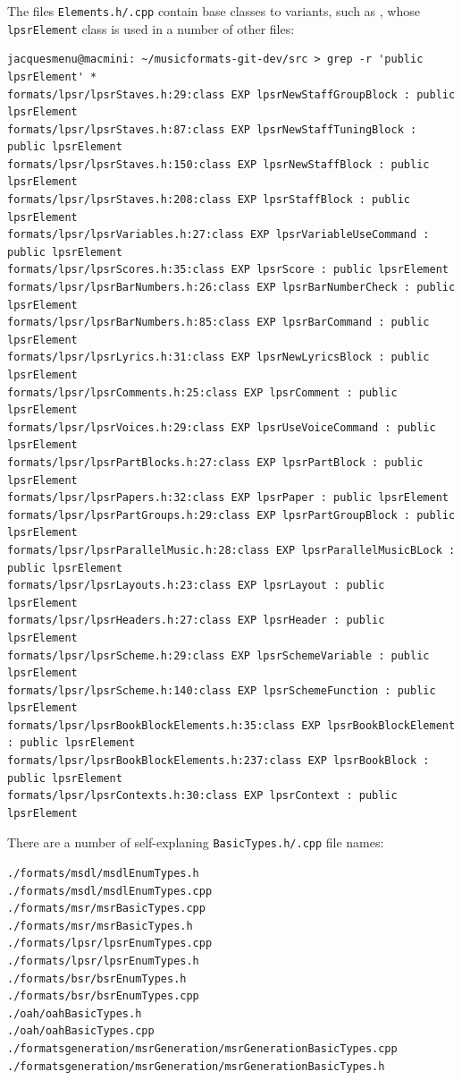 The files {\tt *Elements.h/.cpp} contain base classes to variants, such as , whose {\tt lpsrElement} class   is used in a number of other files:
\begin{lstlisting}[language=Terminal]
jacquesmenu@macmini: ~/musicformats-git-dev/src > grep -r 'public lpsrElement' *
formats/lpsr/lpsrStaves.h:29:class EXP lpsrNewStaffGroupBlock : public lpsrElement
formats/lpsr/lpsrStaves.h:87:class EXP lpsrNewStaffTuningBlock : public lpsrElement
formats/lpsr/lpsrStaves.h:150:class EXP lpsrNewStaffBlock : public lpsrElement
formats/lpsr/lpsrStaves.h:208:class EXP lpsrStaffBlock : public lpsrElement
formats/lpsr/lpsrVariables.h:27:class EXP lpsrVariableUseCommand : public lpsrElement
formats/lpsr/lpsrScores.h:35:class EXP lpsrScore : public lpsrElement
formats/lpsr/lpsrBarNumbers.h:26:class EXP lpsrBarNumberCheck : public lpsrElement
formats/lpsr/lpsrBarNumbers.h:85:class EXP lpsrBarCommand : public lpsrElement
formats/lpsr/lpsrLyrics.h:31:class EXP lpsrNewLyricsBlock : public lpsrElement
formats/lpsr/lpsrComments.h:25:class EXP lpsrComment : public lpsrElement
formats/lpsr/lpsrVoices.h:29:class EXP lpsrUseVoiceCommand : public lpsrElement
formats/lpsr/lpsrPartBlocks.h:27:class EXP lpsrPartBlock : public lpsrElement
formats/lpsr/lpsrPapers.h:32:class EXP lpsrPaper : public lpsrElement
formats/lpsr/lpsrPartGroups.h:29:class EXP lpsrPartGroupBlock : public lpsrElement
formats/lpsr/lpsrParallelMusic.h:28:class EXP lpsrParallelMusicBLock : public lpsrElement
formats/lpsr/lpsrLayouts.h:23:class EXP lpsrLayout : public lpsrElement
formats/lpsr/lpsrHeaders.h:27:class EXP lpsrHeader : public lpsrElement
formats/lpsr/lpsrScheme.h:29:class EXP lpsrSchemeVariable : public lpsrElement
formats/lpsr/lpsrScheme.h:140:class EXP lpsrSchemeFunction : public lpsrElement
formats/lpsr/lpsrBookBlockElements.h:35:class EXP lpsrBookBlockElement : public lpsrElement
formats/lpsr/lpsrBookBlockElements.h:237:class EXP lpsrBookBlock : public lpsrElement
formats/lpsr/lpsrContexts.h:30:class EXP lpsrContext : public lpsrElement
\end{lstlisting}

\newpage

There are a number of self-explaning {\tt *BasicTypes.h/.cpp} file names:%
\begin{lstlisting}[language=Terminal]
./formats/msdl/msdlEnumTypes.h
./formats/msdl/msdlEnumTypes.cpp
./formats/msr/msrBasicTypes.cpp
./formats/msr/msrBasicTypes.h
./formats/lpsr/lpsrEnumTypes.cpp
./formats/lpsr/lpsrEnumTypes.h
./formats/bsr/bsrEnumTypes.h
./formats/bsr/bsrEnumTypes.cpp
./oah/oahBasicTypes.h
./oah/oahBasicTypes.cpp
./formatsgeneration/msrGeneration/msrGenerationBasicTypes.cpp
./formatsgeneration/msrGeneration/msrGenerationBasicTypes.h
\end{lstlisting}

